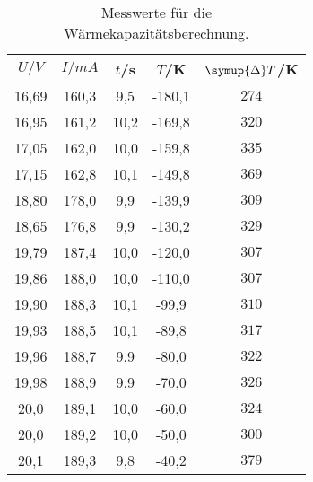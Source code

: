 
\begin{table}
    \centering
    \caption{Messwerte für die Wärmekapazitätsberechnung.}
    \label{Tabg}
    \begin{tabular}{S[table-format=2.1] S S[table-format=2.1] S S} %
      \toprule
       {$U/ \si{V}$}& {$I/\si{mA}$} & {$t$/s} & {$T$/K} & {$\symup{\Delta}T$/K}\\
      \midrule
      \midrule
          {16,69} & {160,3}  &  9,5 & -180,1 & {$274$}  \\
          {16,95} & {161,2}  & 10,2 & -169,8 & {$320$}  \\
          {17,05} & {162,0}  & 10,0 & -159,8 & {$335$}  \\
          {17,15} & {162,8}  & 10,1 & -149,8 & {$369$}  \\
          {18,80} & {178,0}  &  9,9 & -139,9 & {$309$}  \\
          {18,65} & {176,8}  &  9,9 & -130,2 & {$329$}  \\
          {19,79} & {187,4}  & 10,0 & -120,0 & {$307$}  \\
          {19,86} & {188,0}  & 10,0 & -110,0 & {$307$}  \\
          {19,90} & {188,3}  & 10,1 &  -99,9 & {$310$}  \\
          {19,93} & {188,5}  & 10,1 &  -89,8 & {$317$}  \\
          {19,96} & {188,7}  &  9,9 &  -80,0 & {$322$}  \\
          {19,98} & {188,9}  &  9,9 &  -70,0 & {$326$}  \\
          {20,0 } & {189,1}  & 10,0 &  -60,0 & {$324$}  \\
          {20,0 } & {189,2}  & 10,0 &  -50,0 & {$300$}  \\
          {20,1 } & {189,3}  &  9,8 &  -40,2 & {$379$}  \\

\end{tabular}
\end{table}
